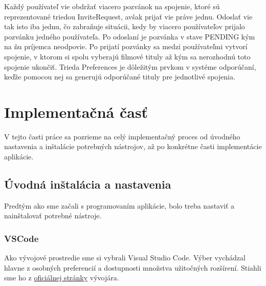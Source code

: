 Každý používateľ vie obdržať viacero pozvánok na spojenie, ktoré sú reprezentované triedou InviteRequest, avšak prijať vie práve jednu. Odoslať vie tak isto iba jednu, čo zabraňuje situácii, kedy by viacero používateľov prijalo pozvánku jedného používateľa. Po odoslaní je pozvánka v stave PENDING kým na ňu príjemca neodpovie. Po prijatí pozvánky sa medzi používateľmi vytvorí spojenie, v ktorom si spolu vyberajú filmové tituly až kým sa nerozhodnú toto spojenie ukončiť. Trieda Preferences je dôležitým prvkom v systéme odporúčaní, keďže pomocou nej sa generujú odporúčané tituly pre jednotlivé spojenia.


\section{Implementačná časť}
V tejto časti práce sa pozrieme na celý implementačný proces od úvodného nastavenia a inštalácie potrebných nástrojov, až po konkrétne časti implementácie aplikácie.

\subsection{Úvodná inštalácia a nastavenia}
Predtým ako sme začali s programovaním aplikácie, bolo treba nastaviť a nainštalovať potrebné nástroje.
\subsubsection{VSCode}
Ako vývojové prostredie sme si vybrali Visual Studio Code. Výber vychádzal hlavne z osobných preferencií a dostupnosti množstva užitočných rozšírení. Stiahli sme ho z \href{https://code.visualstudio.com/download}{oficiálnej stránky} vývojára.
